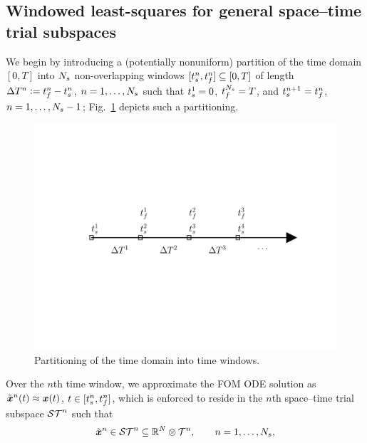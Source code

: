 \subsection{Windowed least-squares for general space--time trial subspaces} 
We begin by introducing a (potentially nonuniform) partition of the time domain $[0,T]$
into $N_s$ non-overlapping windows $[t_s^{n} ,
t_f^{n}]\subseteq[0,T]$ of length $\Delta T^{n}\vcentcolon=t_f^{n} -
t_s^{n}$, $n=1,\ldots,N_s$ such that 
$t_s^{1} = 0$, $t_f^{N_s} = T$, and
$t_s^{n+1} = t_f^{n}$,
$n=1,\ldots,N_s-1$; Fig.~\ref{fig:slab_fig} depicts such a partitioning.
\begin{figure} 
\begin{centering} 
\includegraphics[trim={0.0cm 5cm 0cm 3cm},clip,width=1.0\textwidth]{figs/time_grid.pdf} 
\caption{Partitioning of the time
	domain into time windows. } 
\label{fig:slab_fig} 
\end{centering} 
\end{figure}
Over the $n$th time window, we approximate the FOM ODE solution as 
$\tilde{\boldsymbol x}^n(t)\approx {\boldsymbol x}(t)$,
$t\in[t_s^{n},t_f^{n}]$, which is enforced to reside in 
the $n$th space--time trial subspace 
$\mathcal{ ST }^{n}$
such that
\begin{equation}
\tilde{\boldsymbol x}^n \in \mathcal{ ST }^n \subseteq \mathbb{R}^{N} \otimes \mathcal{T}^{n} , \qquad  n = 1,\ldots,N_s,
\end{equation}
